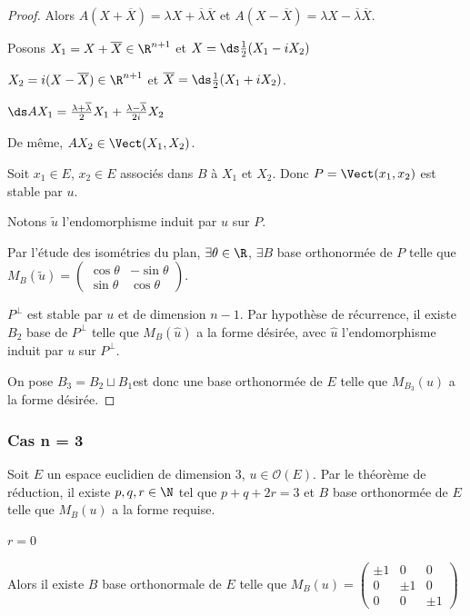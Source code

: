 \begin{proof}
    Alors $A (X + \overline X) = \lambda X + \overline \lambda \overline X$ 
    et $A (X - \overline X) = \lambda X - \overline \lambda \overline X$.

    Posons $X_1 = X + \overline X \in \R^{n + 1}$ et $X = \ds \frac 1 2 (X_1 - iX_2)$

    $X_2 = i(X - \overline X) \in \R^{n + 1}$ et $\overline X = \ds \frac 1 {2} (X_1 + i X_2)$.

    $\ds A X_1 = \frac{\lambda + \overline \lambda}{2} X_1 + \frac{\lambda - \overline \lambda}{2i} X_2$ 

    De même, $A X_2 \in \Vect(X_1, X_2)$. 

    Soit $x_1 \in E$, $x_2 \in E$ associés dans $B$ à $X_1$ et $X_2$. Donc 
    $P = \Vect(x_1, x_2)$ est stable par $u$. 

    Notons $\tilde u$ l'endomorphisme induit par $u$ sur $P$. 

    Par l'étude des isométries du plan, $\exists \theta \in \R$, $\exists B$ base orthonormée de 
    $P$ telle que $M_B(\tilde u) = \begin{pmatrix}
        \cos \theta & -\sin \theta \\
        \sin \theta & \cos \theta
    \end{pmatrix}$.

    $P^\perp$ est stable par $u$ et de dimension $n - 1$. Par hypothèse de récurrence, 
    il existe $B_2$ base de $P^\perp$ telle que 
    $M_B(\hat u)$ a la forme désirée, avec $\hat u$ l'endomorphisme induit par $u$ sur $P^\perp$.

    On pose $B_3 = B_2 \sqcup B_1$est donc une base orthonormée de $E$ telle que 
    $M_{B_3}(u)$ a la forme désirée.
\end{proof}

\subsubsection{Cas n = 3}

Soit $E$ un espace euclidien de dimension 3, $u \in \mathcal O(E)$. 
Par le théorème de réduction, il existe $p, q, r \in \N$ tel que 
$p + q +2r = 3$ et $B$ base orthonormée de $E$ telle que $M_B(u)$ a la forme 
requise. 

 $r = 0$

\svspace Alors il existe $B$ base orthonormale de $E$ telle que $M_B(u) = \begin{pmatrix}
    \pm 1 & 0 & 0 \\
    0 & \pm 1 & 0 \\
    0 & 0 & \pm 1
\end{pmatrix}$ 

